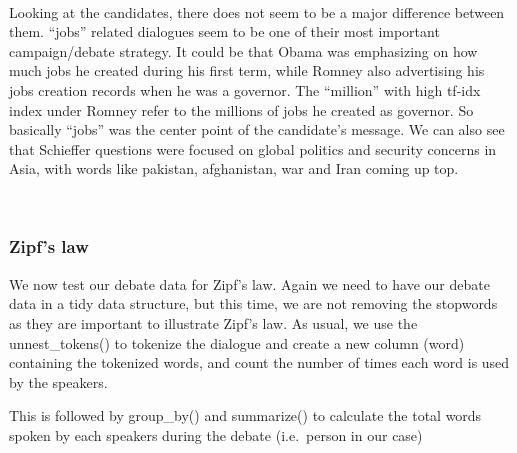 \documentclass[
]{article}
\newenvironment{Shaded}{\begin{snugshade}}{\end{snugshade}}
\newcommand{\DataTypeTok}[1]{\textcolor[rgb]{0.13,0.29,0.53}{#1}}
\newcommand{\KeywordTok}[1]{\textcolor[rgb]{0.13,0.29,0.53}{\textbf{#1}}}
\newcommand{\NormalTok}[1]{#1}
\newcommand{\OperatorTok}[1]{\textcolor[rgb]{0.81,0.36,0.00}{\textbf{#1}}}
\newcommand{\OtherTok}[1]{\textcolor[rgb]{0.56,0.35,0.01}{#1}}
\newcommand{\StringTok}[1]{\textcolor[rgb]{0.31,0.60,0.02}{#1}}
\begin{document}
~

Looking at the candidates, there does not seem to be a major difference
between them. ``jobs'' related dialogues seem to be one of their most
important campaign/debate strategy. It could be that Obama was
emphasizing on how much jobs he created during his first term, while
Romney also advertising his jobs creation records when he was a
governor. The ``million'' with high tf-idx index under Romney refer to
the millions of jobs he created as governor. So basically ``jobs'' was
the center point of the candidate's message. We can also see that
Schieffer questions were focused on global politics and security
concerns in Asia, with words like pakistan, afghanistan, war and Iran
coming up top.

~

\hypertarget{zipfs-law}{%
\subsubsection{Zipf's law}\label{zipfs-law}}

We now test our debate data for Zipf's law. Again we need to have our
debate data in a tidy data structure, but this time, we are not removing
the stopwords as they are important to illustrate Zipf's law. As usual,
we use the unnest\_tokens() to tokenize the dialogue and create a new
column (word) containing the tokenized words, and count the number of
times each word is used by the speakers.

\begin{Shaded}
\end{Shaded}

This is followed by group\_by() and summarize() to calculate the total
words spoken by each speakers during the debate (i.e.~person in our
case)

\begin{Shaded}
\end{Shaded}
\end{document}
